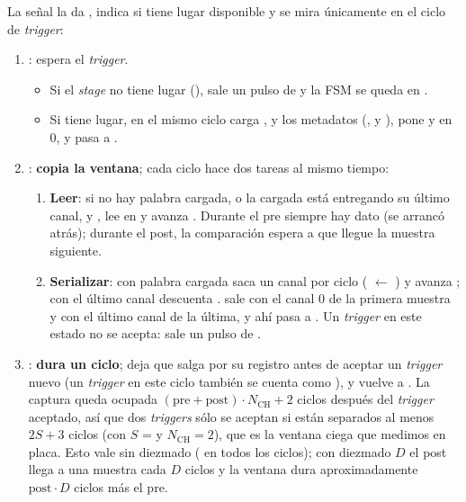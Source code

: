 La señal  la da , indica si tiene
lugar disponible y se mira únicamente en el ciclo de \emph{trigger}:
\begin{enumerate}
  \item {}: espera el \emph{trigger}.
  \begin{itemize}
    \item Si el \emph{stage} no tiene lugar (), sale un pulso
      de  y la FSM se queda en .
    \item Si tiene lugar, en el mismo ciclo carga
      ,
       y los metadatos
      (,  y ), pone
       y  en 0, y pasa a
      .
  \end{itemize}
  \item {}: \textbf{copia la ventana}; cada ciclo hace dos tareas al
    mismo tiempo:
  \begin{enumerate}
    \item \textbf{Leer}: si no hay palabra cargada, o la cargada está entregando
      su último canal, y , lee
       en  y avanza
      . Durante el pre siempre hay dato (se arrancó
       atrás); durante el post, la comparación espera a que llegue
      la muestra siguiente.
    \item \begin{sloppypar}\textbf{Serializar}: con palabra cargada saca un canal por ciclo
      ( $\leftarrow$ ) y avanza
      ; con el último canal descuenta .
       sale con el canal 0 de la primera muestra y
       con el último canal de la última, y ahí pasa a
      . Un \emph{trigger} en este estado no se acepta: sale un pulso
      de .\end{sloppypar}
  \end{enumerate}
  \item {}: \textbf{dura un ciclo}; deja que 
    salga por su registro antes de aceptar un \emph{trigger} nuevo (un \emph{trigger} en este
    ciclo también se cuenta como ), y vuelve a
    . La captura queda ocupada
    $(\text{pre}+\text{post})\cdot N_\text{CH} + 2$ ciclos después del \emph{trigger}
    aceptado, así que dos \emph{triggers} sólo se aceptan si están separados al menos
    $2S+3$ ciclos (con $S$ =  y $N_\text{CH}=2$), que es la
    ventana ciega que medimos en placa. Esto vale sin diezmado ( en
    todos los ciclos); con diezmado $D$ el post llega a una muestra cada $D$
    ciclos y la ventana dura aproximadamente $\text{post}\cdot D$ ciclos más el
    pre.
\end{enumerate}

